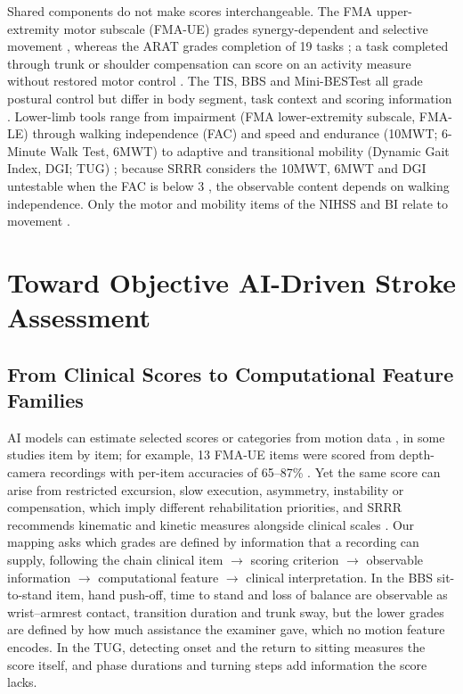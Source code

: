 \documentclass[11pt]{article}
\begin{document}
Shared components do not make scores interchangeable. The FMA upper-extremity motor subscale (FMA-UE) grades synergy-dependent and selective movement \cite{ScaleFuglMeyer1975PhysicalPerformance,ScaleSee2013StandardizedFMA}, whereas the ARAT grades completion of 19 tasks \cite{ScaleYozbatiran2008StandardizedARAT}; a task completed through trunk or shoulder compensation can score on an activity measure without restored motor control \cite{Levin2009RecoveryCompensation,Santisteban2016UpperLimbOutcome}. The TIS, BBS and Mini-BESTest all grade postural control but differ in body segment, task context and scoring information \cite{ScaleVerheyden2004TIS,ScaleBerg1992BalanceValidation,ScaleFranchignoni2010MiniBESTest}. Lower-limb tools range from impairment (FMA lower-extremity subscale, FMA-LE) through walking independence (FAC) and speed and endurance (10MWT; 6-Minute Walk Test, 6MWT) to adaptive and transitional mobility (Dynamic Gait Index, DGI; TUG) \cite{ScaleHolden1984FAC,ScaleCheng2020StrokeWalkTests,ScaleAn2017DGIStroke,ScaleNg2005TUGStroke}; because SRRR considers the 10MWT, 6MWT and DGI untestable when the FAC is below 3 \cite{CoreVanCriekinge2024SRRRBalanceMobility}, the observable content depends on walking independence. Only the motor and mobility items of the NIHSS and BI relate to movement \cite{ScaleBrott1989NIHSS,ScaleMahoney1965Barthel}.


\clearpage

\section{Toward Objective AI-Driven Stroke Assessment}
\label{sec:framework}
\subsection{From Clinical Scores to Computational Feature Families}

AI models can estimate selected scores or categories from motion data \cite{Lee2021SmartphoneVideoAmbulation,Formstone2021IMUMMG,Zamin2023BIONICS,Li2017IMUEMGMotorEvaluation}, in some studies item by item; for example, 13 FMA-UE items were scored from depth-camera recordings with per-item accuracies of 65--87\% \cite{Kim2016KinectFMA}. Yet the same score can arise from restricted excursion, slow execution, asymmetry, instability or compensation, which imply different rehabilitation priorities, and SRRR recommends kinematic and kinetic measures alongside clinical scales \cite{CoreKwakkel2019SRRRUpperLimb,CoreVanCriekinge2024SRRRBalanceMobility}. Our mapping asks which grades are defined by information that a recording can supply, following the chain clinical item $\rightarrow$ scoring criterion $\rightarrow$ observable information $\rightarrow$ computational feature $\rightarrow$ clinical interpretation. In the BBS sit-to-stand item, hand push-off, time to stand and loss of balance are observable as wrist--armrest contact, transition duration and trunk sway, but the lower grades are defined by how much assistance the examiner gave, which no motion feature encodes. In the TUG, detecting onset and the return to sitting measures the score itself, and phase durations and turning steps add information the score lacks.
\end{document}
